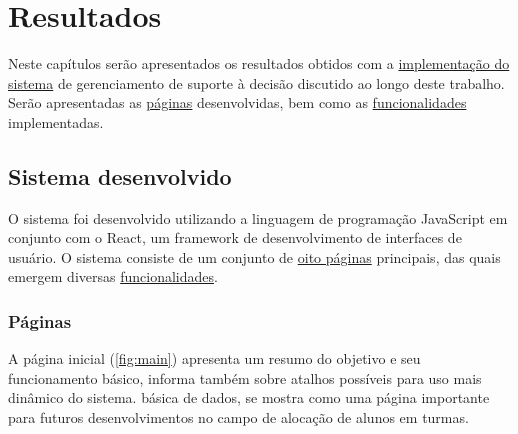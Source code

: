 \chapter{Resultados} \label{chap:resultados} %

Neste capítulos serão apresentados os resultados obtidos com a \hyperref[sec:sistema]{implementação do sistema} de gerenciamento de suporte à decisão discutido ao longo deste trabalho. Serão apresentadas as \hyperref[ssec:paginas]{páginas} desenvolvidas, bem como as \hyperref[ssec:funcionalidades]{funcionalidades} implementadas.




\section{Sistema desenvolvido} \label{sec:sistema}

O sistema foi desenvolvido utilizando a linguagem de programação JavaScript em conjunto com o React, um framework de desenvolvimento de interfaces de usuário. O sistema consiste de um conjunto de \hyperref[ssec:paginas]{oito páginas} principais, das quais emergem diversas \hyperref[ssec:funcionalidades]{funcionalidades}.

\subsection{Páginas} \label{ssec:paginas}

A página inicial (\autoref{fig:main}) apresenta um resumo do objetivo e seu funcionamento básico, informa também sobre atalhos possíveis para uso mais dinâmico do sistema.
básica de dados, se mostra como uma página importante para futuros desenvolvimentos no campo de alocação de alunos em turmas.

